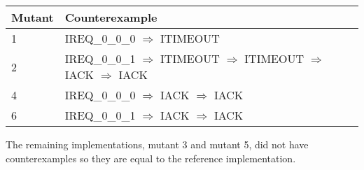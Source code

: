 \documentclass[11pt,a4paper]{article}
\begin{document}
\begin{center}
\begin{tabular}{l|l}
\textbf{Mutant} & \textbf{Counterexample}\\
\hline
1 & IREQ\_0\_0\_0 $\Rightarrow$ ITIMEOUT\\
2 & IREQ\_0\_0\_1 $\Rightarrow$ ITIMEOUT $\Rightarrow$ ITIMEOUT $\Rightarrow$ IACK $\Rightarrow$ IACK\\
4 & IREQ\_0\_0\_0 $\Rightarrow$ IACK $\Rightarrow$ IACK\\
6 & IREQ\_0\_0\_1 $\Rightarrow$ IACK $\Rightarrow$ IACK\\
\end{tabular}
\end{center}

The remaining implementations, mutant 3 and mutant 5, did not have counterexamples
so they are equal to the reference implementation.


\end{document}
